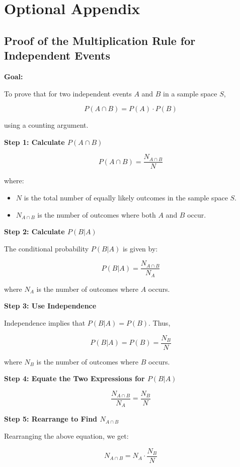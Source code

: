 \documentclass{article}
\begin{document}
\newpage

\section*{Optional Appendix}

\subsection*{Proof of the Multiplication Rule for Independent Events}

\textbf{Goal:}

To prove that for two independent events \( A \) and \( B \) in a sample space \( S \),

\[ P(A \cap B) = P(A) \cdot P(B) \]

using a counting argument.

\textbf{Step 1: Calculate \( P(A \cap B) \)}

\[
P(A \cap B) = \frac{N_{A \cap B}}{N}
\]

where:
\begin{itemize}
    \item \( N \) is the total number of equally likely outcomes in the sample space \( S \).
    \item \( N_{A \cap B} \) is the number of outcomes where both \( A \) and \( B \) occur.
\end{itemize}

\textbf{Step 2: Calculate \( P(B|A) \)}

The conditional probability \( P(B|A) \) is given by:

\[
P(B|A) = \frac{N_{A \cap B}}{N_A}
\]

where \( N_A \) is the number of outcomes where \( A \) occurs.

\textbf{Step 3: Use Independence}

Independence implies that \( P(B|A) = P(B) \). Thus,

\[
P(B|A) = P(B) = \frac{N_B}{N}
\]

where \( N_B \) is the number of outcomes where \( B \) occurs.

\textbf{Step 4: Equate the Two Expressions for \( P(B|A) \)}

\[
\frac{N_{A \cap B}}{N_A} = \frac{N_B}{N}
\]

\textbf{Step 5: Rearrange to Find \( N_{A \cap B} \)}

Rearranging the above equation, we get:

\[
N_{A \cap B} = N_A \cdot \frac{N_B}{N}
\]
\end{document}
